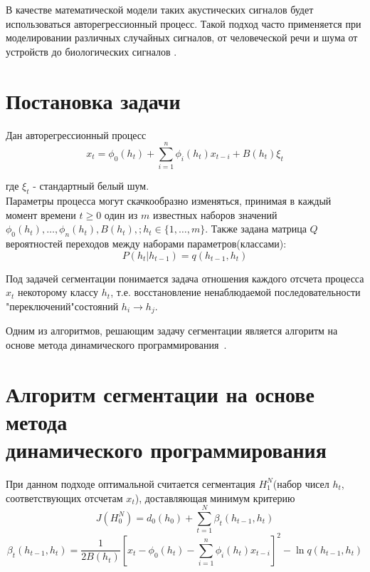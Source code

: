\documentclass[12pt,a4paper]{article}
\begin{document}
В качестве математической модели таких акустических сигналов будет использоваться авторегрессионный процесс. Такой подход часто применяется при моделировании различных случайных сигналов, от человеческой речи и шума от устройств \cite{TVAR, vehicles} до биологических сигналов \cite{bio}.

\section{Постановка задачи}
Дан авторегрессионный процесс
$$x_t = \phi_0(h_t) + \sum_{i=1}^{n} \phi_i(h_t)x_{t-i} + B(h_t)\xi_t$$

где $\xi_t$ - стандартный белый шум.\\
Параметры процесса могут скачкообразно изменяться, принимая в каждый момент времени $t\geq 0$ один  из $m$ известных наборов значений\\ $\phi_0(h_t),\dots,\phi_n(h_t), B(h_t),;h_t \in \{1,\dots,m\}$.
Также задана матрица $Q$ вероятностей переходов между наборами параметров(классами):
$$P(h_t|h_{t-1}) = q(h_{t-1}, h_t)$$

Под задачей сегментации понимается задача отношения каждого отсчета процесса $x_t$ некоторому классу $h_t$, т.е. восстановление ненаблюдаемой последовательности "переключений"\space состояний $h_i \longrightarrow h_j$.

Одним из алгоритмов, решающим задачу сегментации является алгоритм на основе метода динамического программирования~\cite{burobin}.

\section{Алгоритм сегментации на основе метода\\ динамического программирования}
При данном подходе оптимальной считается сегментация $H_1^N$(набор чисел $h_t$, соответствующих отсчетам $x_t$), доставляющая минимум критерию
\begin{equation}
\label{criteria}
J(H_0^N) = d_0(h_0) +\sum_{t=1}^{N}\beta_t(h_{t-1},h_t)
\end{equation}
$$\beta_t(h_{t-1},h_t) = \frac{1}{2B(h_t)}[x_t-\phi_0(h_t)-\sum_{i=1}^{n}\phi_i(h_t)x_{t-i}]^2-\ln q(h_{t-1},h_t)$$
\end{document}
